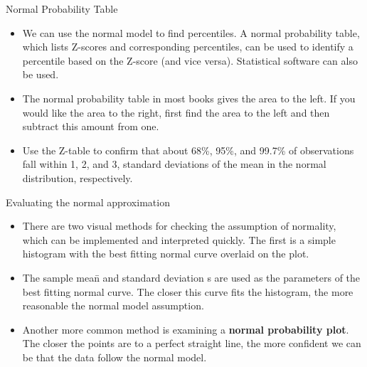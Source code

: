 \documentclass[
  ignorenonframetext,
]{beamer}
\begin{document}
\begin{frame}{Normal Probability Table}
\protect\hypertarget{normal-probability-table-1}{}

\begin{itemize}
\item
  We can use the normal model to find percentiles. A normal probability
  table, which lists Z-scores and corresponding percentiles, can be used
  to identify a percentile based on the Z-score (and vice versa).
  Statistical software can also be used.
\item
  The normal probability table in most books gives the area to the left.
  If you would like the area to the right, first find the area to the
  left and then subtract this amount from one.
\item
  Use the Z-table to confirm that about 68\%, 95\%, and 99.7\% of
  observations fall within 1, 2, and 3, standard deviations of the mean
  in the normal distribution, respectively.
\end{itemize}

\end{frame}

\begin{frame}{Evaluating the normal approximation}
\protect\hypertarget{evaluating-the-normal-approximation}{}

\begin{itemize}
\item
  There are two visual methods for checking the assumption of normality,
  which can be implemented and interpreted quickly. The first is a
  simple histogram with the best fitting normal curve overlaid on the
  plot.
\item
  The sample mean̄ and standard deviation s are used as the parameters of
  the best fitting normal curve. The closer this curve fits the
  histogram, the more reasonable the normal model assumption.
\item
  Another more common method is examining a \textbf{normal probability
  plot}. The closer the points are to a perfect straight line, the more
  confident we can be that the data follow the normal model.
\end{itemize}

\end{frame}
\end{document}
